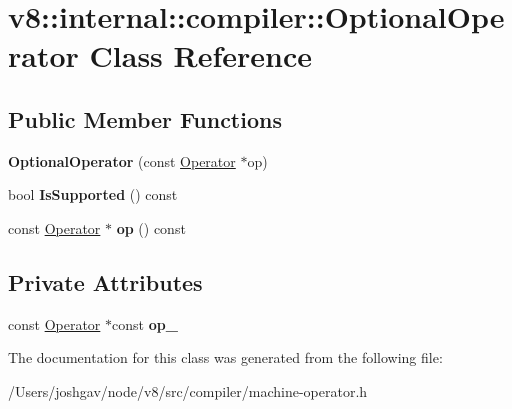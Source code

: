 \hypertarget{classv8_1_1internal_1_1compiler_1_1_optional_operator}{}\section{v8\+:\+:internal\+:\+:compiler\+:\+:Optional\+Operator Class Reference}
\label{classv8_1_1internal_1_1compiler_1_1_optional_operator}
\subsection*{Public Member Functions}
\begin{DoxyCompactItemize}
\item 
{\bfseries Optional\+Operator} (const \hyperlink{classv8_1_1internal_1_1compiler_1_1_operator}{Operator} $\ast$op)\hypertarget{classv8_1_1internal_1_1compiler_1_1_optional_operator_a09122dfe404f5b50feb57cdb60c33ad6}{}\label{classv8_1_1internal_1_1compiler_1_1_optional_operator_a09122dfe404f5b50feb57cdb60c33ad6}

\item 
bool {\bfseries Is\+Supported} () const \hypertarget{classv8_1_1internal_1_1compiler_1_1_optional_operator_aafb6e786ba202eca82466045b23d9905}{}\label{classv8_1_1internal_1_1compiler_1_1_optional_operator_aafb6e786ba202eca82466045b23d9905}

\item 
const \hyperlink{classv8_1_1internal_1_1compiler_1_1_operator}{Operator} $\ast$ {\bfseries op} () const \hypertarget{classv8_1_1internal_1_1compiler_1_1_optional_operator_a387dae47a21f9b34d2027e21ef5b8973}{}\label{classv8_1_1internal_1_1compiler_1_1_optional_operator_a387dae47a21f9b34d2027e21ef5b8973}

\end{DoxyCompactItemize}
\subsection*{Private Attributes}
\begin{DoxyCompactItemize}
\item 
const \hyperlink{classv8_1_1internal_1_1compiler_1_1_operator}{Operator} $\ast$const {\bfseries op\+\_\+}\hypertarget{classv8_1_1internal_1_1compiler_1_1_optional_operator_a5035870466889a25db2647ed49daa3a7}{}\label{classv8_1_1internal_1_1compiler_1_1_optional_operator_a5035870466889a25db2647ed49daa3a7}

\end{DoxyCompactItemize}


The documentation for this class was generated from the following file\+:\begin{DoxyCompactItemize}
\item 
/\+Users/joshgav/node/v8/src/compiler/machine-\/operator.\+h\end{DoxyCompactItemize}
